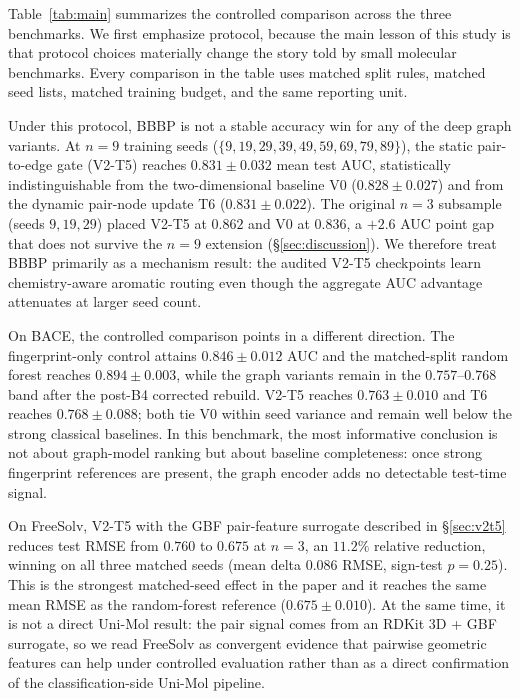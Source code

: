 \documentclass[conference]{IEEEtran}
\begin{document}
Table~\ref{tab:main} summarizes the controlled comparison across the three benchmarks. We first emphasize protocol, because the main lesson of this study is that protocol choices materially change the story told by small molecular benchmarks. Every comparison in the table uses matched split rules, matched seed lists, matched training budget, and the same reporting unit.

Under this protocol, BBBP is not a stable accuracy win for any of the deep graph variants. At $n{=}9$ training seeds ($\{9, 19, 29, 39, 49, 59, 69, 79, 89\}$), the static pair-to-edge gate (V2-T5) reaches $0.831 \pm 0.032$ mean test AUC, statistically indistinguishable from the two-dimensional baseline V0 ($0.828 \pm 0.027$) and from the dynamic pair-node update T6 ($0.831 \pm 0.022$). The original $n{=}3$ subsample (seeds $9, 19, 29$) placed V2-T5 at $0.862$ and V0 at $0.836$, a $+2.6$ AUC point gap that does not survive the $n{=}9$ extension (\S\ref{sec:discussion}). We therefore treat BBBP primarily as a mechanism result: the audited V2-T5 checkpoints learn chemistry-aware aromatic routing even though the aggregate AUC advantage attenuates at larger seed count.

On BACE, the controlled comparison points in a different direction. The fingerprint-only control attains $0.846 \pm 0.012$ AUC and the matched-split random forest reaches $0.894 \pm 0.003$, while the graph variants remain in the $0.757$--$0.768$ band after the post-B4 corrected rebuild. V2-T5 reaches $0.763 \pm 0.010$ and T6 reaches $0.768 \pm 0.088$; both tie V0 within seed variance and remain well below the strong classical baselines. In this benchmark, the most informative conclusion is not about graph-model ranking but about baseline completeness: once strong fingerprint references are present, the graph encoder adds no detectable test-time signal.

On FreeSolv, V2-T5 with the GBF pair-feature surrogate described in \S\ref{sec:v2t5} reduces test RMSE from $0.760$ to $0.675$ at $n{=}3$, an $11.2\%$ relative reduction, winning on all three matched seeds (mean delta $0.086$ RMSE, sign-test $p{=}0.25$). This is the strongest matched-seed effect in the paper and it reaches the same mean RMSE as the random-forest reference ($0.675 \pm 0.010$). At the same time, it is not a direct Uni-Mol result: the pair signal comes from an RDKit 3D + GBF surrogate, so we read FreeSolv as convergent evidence that pairwise geometric features can help under controlled evaluation rather than as a direct confirmation of the classification-side Uni-Mol pipeline.
\end{document}

